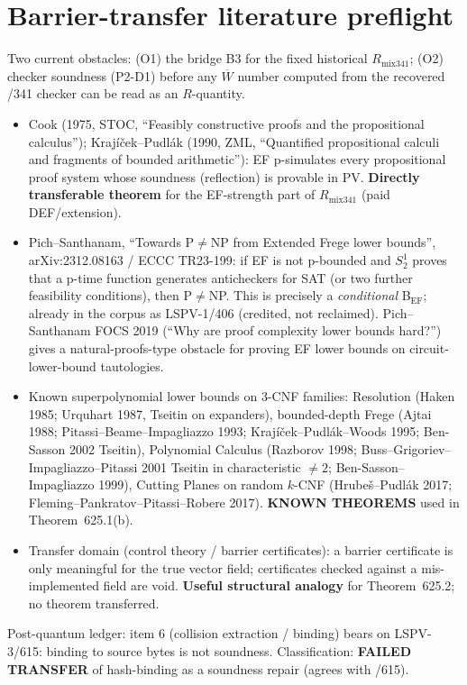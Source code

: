 \documentclass[11pt]{article}
\begin{document}
\section*{Barrier-transfer literature preflight}
Two current obstacles: (O1) the bridge B3 for the fixed historical $R_{\mathrm{mix341}}$; (O2) checker soundness (P2-D1) before any $\overline W$ number computed from the recovered /341 checker can be read as an $R$-quantity.
\begin{itemize}
\item Cook (1975, STOC, ``Feasibly constructive proofs and the propositional calculus''); Krajíček--Pudlák (1990, ZML, ``Quantified propositional calculi and fragments of bounded arithmetic''): EF p-simulates every propositional proof system whose soundness (reflection) is provable in PV. \textbf{Directly transferable theorem} for the EF-strength part of $R_{\mathrm{mix341}}$ (paid DEF/extension).
\item Pich--Santhanam, ``Towards P$\ne$NP from Extended Frege lower bounds'', arXiv:2312.08163 / ECCC TR23-199: if EF is not p-bounded and $S^1_2$ proves that a p-time function generates anticheckers for SAT (or two further feasibility conditions), then P$\ne$NP. This is precisely a \emph{conditional} B$_{\mathrm{EF}}$; already in the corpus as LSPV-1/406 (credited, not reclaimed). Pich--Santhanam FOCS 2019 (``Why are proof complexity lower bounds hard?'') gives a natural-proofs-type obstacle for proving EF lower bounds on circuit-lower-bound tautologies.
\item Known superpolynomial lower bounds on 3-CNF families: Resolution (Haken 1985; Urquhart 1987, Tseitin on expanders), bounded-depth Frege (Ajtai 1988; Pitassi--Beame--Impagliazzo 1993; Krajíček--Pudlák--Woods 1995; Ben-Sasson 2002 Tseitin), Polynomial Calculus (Razborov 1998; Buss--Grigoriev--Impagliazzo--Pitassi 2001 Tseitin in characteristic $\ne2$; Ben-Sasson--Impagliazzo 1999), Cutting Planes on random $k$-CNF (Hrubeš--Pudlák 2017; Fleming--Pankratov--Pitassi--Robere 2017). \textbf{KNOWN THEOREMS} used in Theorem~625.1(b).
\item Transfer domain (control theory / barrier certificates): a barrier certificate is only meaningful for the true vector field; certificates checked against a mis-implemented field are void. \textbf{Useful structural analogy} for Theorem~625.2; no theorem transferred.
\end{itemize}
Post-quantum ledger: item 6 (collision extraction / binding) bears on LSPV-3/615: binding to source bytes is not soundness. Classification: \textbf{FAILED TRANSFER} of hash-binding as a soundness repair (agrees with /615).
\end{document}
